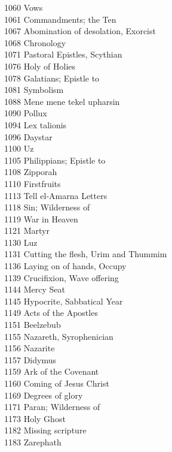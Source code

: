 1060 \quad Vows\\
1061 \quad Commandments; the Ten\\
1067 \quad Abomination of desolation, Exorcist\\
1068 \quad Chronology\\
1071 \quad Pastoral Epistles, Scythian\\
1076 \quad Holy of Holies\\
1078 \quad Galatians; Epistle to\\
1081 \quad Symbolism\\
1088 \quad Mene mene tekel upharsin\\
1090 \quad Pollux\\
1094 \quad Lex talionis\\
1096 \quad Daystar\\
1100 \quad Uz\\
1105 \quad Philippians; Epistle to\\
1108 \quad Zipporah\\
1110 \quad Firstfruits\\
1113 \quad Tell el-Amarna Letters\\
1118 \quad Sin; Wilderness of\\
1119 \quad War in Heaven\\
1121 \quad Martyr\\
1130 \quad Luz\\
1131 \quad Cutting the flesh, Urim and Thummim\\
1136 \quad Laying on of hands, Occupy\\
1139 \quad Crucifixion, Wave offering\\
1144 \quad Mercy Seat\\
1145 \quad Hypocrite, Sabbatical Year\\
1149 \quad Acts of the Apostles\\
1151 \quad Beelzebub\\
1155 \quad Nazareth, Syrophenician\\
1156 \quad Nazarite\\
1157 \quad Didymus\\
1159 \quad Ark of the Covenant\\
1160 \quad Coming of Jesus Christ\\
1169 \quad Degrees of glory\\
1171 \quad Paran; Wilderness of\\
1173 \quad Holy Ghost\\
1182 \quad Missing scripture\\
1183 \quad Zarephath\\
